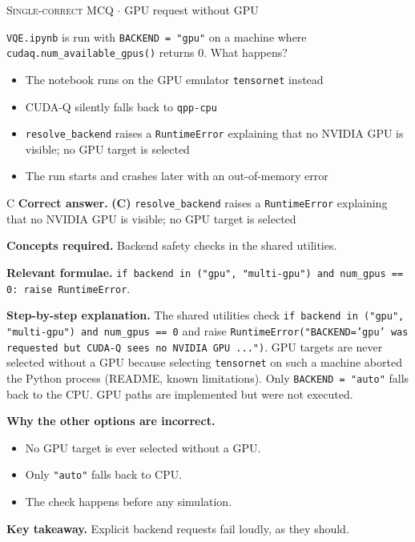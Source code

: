 \documentclass[11pt,a4paper]{article}
\newcommand{\optlabel}[1]{\textbf{(#1)}}
\newcommand{\correctlabel}[1]{\textcolor{okgreen}{\textbf{(#1)}\,\ding{51}}}
\newenvironment{qitem}[1]{\begin{list}{}{\setlength{\leftmargin}{3.3em}\setlength{\labelwidth}{3.1em}%
  \setlength{\labelsep}{0.2em}\setlength{\topsep}{3pt}\setlength{\parsep}{3pt}}\item[\textbf{Q.#1}\hfill]}{\end{list}}
\newcommand{\qsep}{\par\vspace{2pt}{\color{black!15}\hrule}\vspace{4pt}}
\newcommand{\qmeta}[2]{{\footnotesize\color{black!60}\textsc{#1} \;$\cdot$\; #2}\par}
\begin{document}
\begin{qitem}{73}
\qmeta{Single-correct MCQ}{GPU request without GPU}
\texttt{VQE.ipynb} is run with \texttt{BACKEND = "gpu"} on a machine where \texttt{cudaq.num\_available\_gpus()} returns 0. What happens?
\begin{itemize}[leftmargin=2.6em, labelsep=0.4em, itemsep=2pt, topsep=3pt]
\item[\optlabel{A}] The notebook runs on the GPU emulator \texttt{tensornet} instead
\item[\optlabel{B}] CUDA-Q silently falls back to \texttt{qpp-cpu}
\item[\correctlabel{C}] \texttt{resolve\_backend} raises a \texttt{RuntimeError} explaining that no NVIDIA GPU is visible; no GPU target is selected
\item[\optlabel{D}] The run starts and crashes later with an out-of-memory error
\end{itemize}
\end{qitem}
\begin{solbox}{C}
\textbf{\color{brand}Correct answer.} \textcolor{okgreen}{\textbf{(C)}} \texttt{resolve\_backend} raises a \texttt{RuntimeError} explaining that no NVIDIA GPU is visible; no GPU target is selected

\textbf{\color{brand}Concepts required.} Backend safety checks in the shared utilities.

\textbf{\color{brand}Relevant formulae.} \texttt{if backend in ("gpu", "multi-gpu") and num\_gpus == 0: raise RuntimeError}.

\textbf{\color{brand}Step-by-step explanation.} The shared utilities check \texttt{if backend in ("gpu", "multi-gpu") and num\_gpus == 0} and raise \texttt{RuntimeError("BACKEND='gpu' was requested but CUDA-Q
sees no NVIDIA GPU ...")}. GPU targets are never selected without a GPU because selecting \texttt{tensornet} on such a machine aborted the
Python process (README, known limitations). Only \texttt{BACKEND = "auto"} falls back to the CPU. GPU paths are implemented but were not executed.

\textbf{\color{brand}Why the other options are incorrect.}
\begin{itemize}[leftmargin=2.4em, itemsep=1pt, topsep=2pt]
\item[\textbf{(A)}] No GPU target is ever selected without a GPU.
\item[\textbf{(B)}] Only \texttt{"auto"} falls back to CPU.
\item[\textbf{(D)}] The check happens before any simulation.
\end{itemize}
\textbf{\color{brand}Key takeaway.} Explicit backend requests fail loudly, as they should.
\end{solbox}
\qsep
\end{document}
